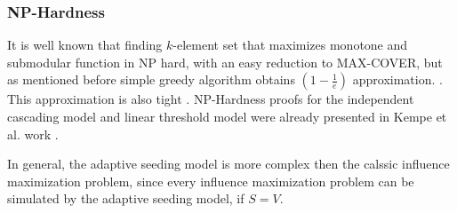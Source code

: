 
\subsubsection{NP-Hardness}
It is well known that finding $k$-element set that maximizes monotone and submodular function in NP hard, with an easy reduction to MAX-COVER, but as mentioned before simple greedy algorithm obtains $(1-\frac{1}{e})$ approximation. \cite{nemhauser1978analysis}. This approximation is also tight \cite{feige1998threshold}.
NP-Hardness proofs for the independent cascading model and linear threshold model were already presented in 
Kempe et al. work \cite{kempe2003maximizing}. 

In general, the adaptive seeding model is more complex then the calssic influence maximization problem, since every influence maximization problem can be simulated by the adaptive seeding model, if $S=V$.



